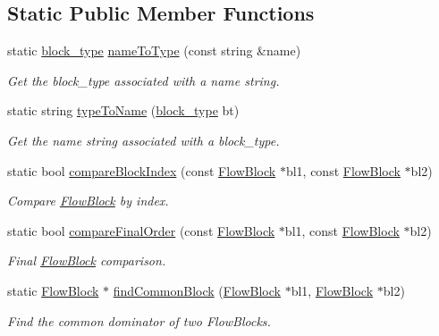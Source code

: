 \subsection*{Static Public Member Functions}
\begin{DoxyCompactItemize}
\item 
static \mbox{\hyperlink{class_flow_block_a70df78390870fcdd51e31426ba6a193e}{block\+\_\+type}} \mbox{\hyperlink{class_flow_block_a0d80ab1ac96b718913a58b690357828b}{name\+To\+Type}} (const string \&name)
\begin{DoxyCompactList}\small\item\em Get the block\+\_\+type associated with a name string. \end{DoxyCompactList}\item 
static string \mbox{\hyperlink{class_flow_block_ade29abe8cdfae0daaeb6a65c057065c6}{type\+To\+Name}} (\mbox{\hyperlink{class_flow_block_a70df78390870fcdd51e31426ba6a193e}{block\+\_\+type}} bt)
\begin{DoxyCompactList}\small\item\em Get the name string associated with a block\+\_\+type. \end{DoxyCompactList}\item 
static bool \mbox{\hyperlink{class_flow_block_ac83c5d30331ddcae56c23c96088e2ce7}{compare\+Block\+Index}} (const \mbox{\hyperlink{class_flow_block}{Flow\+Block}} $\ast$bl1, const \mbox{\hyperlink{class_flow_block}{Flow\+Block}} $\ast$bl2)
\begin{DoxyCompactList}\small\item\em Compare \mbox{\hyperlink{class_flow_block}{Flow\+Block}} by index. \end{DoxyCompactList}\item 
static bool \mbox{\hyperlink{class_flow_block_a743cb628028fcd227b072bb14587f08e}{compare\+Final\+Order}} (const \mbox{\hyperlink{class_flow_block}{Flow\+Block}} $\ast$bl1, const \mbox{\hyperlink{class_flow_block}{Flow\+Block}} $\ast$bl2)
\begin{DoxyCompactList}\small\item\em Final \mbox{\hyperlink{class_flow_block}{Flow\+Block}} comparison. \end{DoxyCompactList}\item 
static \mbox{\hyperlink{class_flow_block}{Flow\+Block}} $\ast$ \mbox{\hyperlink{class_flow_block_a5c7762af431a7897d31d51f6391926c2}{find\+Common\+Block}} (\mbox{\hyperlink{class_flow_block}{Flow\+Block}} $\ast$bl1, \mbox{\hyperlink{class_flow_block}{Flow\+Block}} $\ast$bl2)
\begin{DoxyCompactList}\small\item\em Find the common dominator of two Flow\+Blocks. \end{DoxyCompactList}\end{DoxyCompactItemize}
